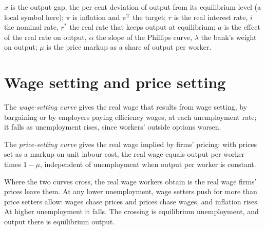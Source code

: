 \begin{notation}\label{not:b2:three-equation-model:symbols}
$x$ is the output gap, the per cent deviation of output from its equilibrium level (a local symbol here); $\pi$ is inflation and $\pi^{\mathrm T}$ the target; $r$ is the
real interest rate, $i$ the nominal rate, $r^*$ the real rate that keeps output at equilibrium; $a$ is the effect of the real rate on
output, $\alpha$ the slope of the Phillips curve, $\lambda$ the bank's weight on output; $\mu$ is the price markup as a share of output per worker.
\end{notation}

\section{Wage setting and price setting}\label{sec:b2:three-equation-model:ws-ps}

\begin{definition}\label{def:b2:three-equation-model:ws}
The \emph{wage-setting curve} gives the real wage that results from wage setting, by bargaining or by
employers paying efficiency wages, at each unemployment rate; it falls as unemployment rises, since workers' outside
options worsen.
\end{definition}

\begin{definition}\label{def:b2:three-equation-model:ps}
The \emph{price-setting curve} gives the real wage implied by firms' pricing: with prices set as a
markup on unit labour cost, the real wage equals output per worker times $1 - \mu$, independent of unemployment when output per worker is
constant.
\end{definition}

Where the two curves cross, the real wage workers obtain is the real wage firms' prices leave them. At any lower
unemployment, wage setters push for more than price setters allow: wages chase prices and prices chase wages, and inflation
rises. At higher unemployment it falls. The crossing is equilibrium unemployment, and output there is equilibrium output.

